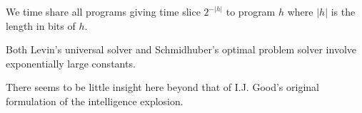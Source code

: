 {
  
\vfill
We time share all programs giving time slice $2^{-|h|}$ to program $h$ where $|h|$
is the length in bits of $h$.

\vfill
Both Levin's universal solver and Schmidhuber's optimal problem solver involve exponentially large constants.

\vfill
There seems to be little insight here beyond that of I.J. Good's original formulation of the intelligence explosion.


}

